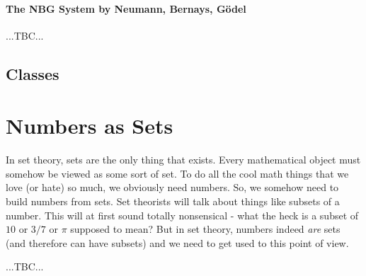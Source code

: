 \paragraph{The NBG System by Neumann, Bernays, Gödel} ...TBC...







\subsection{Classes}



\section{Numbers as Sets}
In set theory, sets are the only thing that exists. Every mathematical object must somehow be viewed as some sort of set. To do all the cool math things that we love (or hate) so much, we obviously need numbers. So, we somehow need to build numbers from sets. Set theorists will talk about things like subsets of a number. This will at first sound totally nonsensical - what the heck is a subset of $10$ or $3/7$ or $\pi$ supposed to mean? But in set theory, numbers indeed \emph{are} sets (and therefore can have subsets) and we need to get used to this point of view.

% 

...TBC... 

